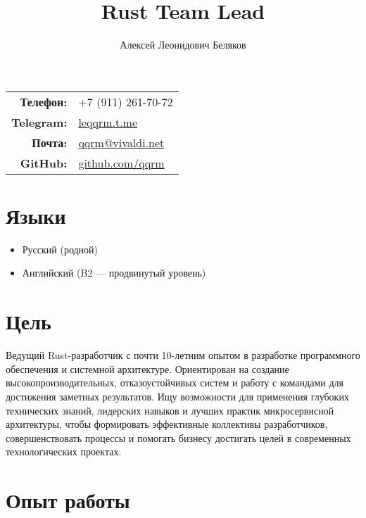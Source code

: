 \documentclass[a4paper,12pt]{article}
\title{\textbf{Rust Team Lead}}
\author{Алексей Леонидович Беляков}
\begin{document}
\maketitle

\begin{center}
    \begin{tabular}{rl}
        \textbf{Телефон:} & +7 (911) 261-70-72 \\
        \textbf{Telegram:} & \href{https://leqqrm.t.me}{leqqrm.t.me} \\
        \textbf{Почта:} & \href{mailto:qqrm@vivaldi.net}{qqrm@vivaldi.net} \\
        \textbf{GitHub:} & \href{https://github.com/qqrm}{github.com/qqrm} \\
    \end{tabular}
\end{center}

\vspace{5mm}

\section*{Языки}
\begin{itemize}[leftmargin=15pt]
    \item Русский (родной)
    \item Английский (B2 — продвинутый уровень)
\end{itemize}

\section*{Цель}
Ведущий Rust-разработчик с почти 10-летним опытом в разработке программного обеспечения и системной архитектуре. Ориентирован на создание высокопроизводительных, отказоустойчивых систем и работу с командами для достижения заметных результатов. Ищу возможности для применения глубоких технических знаний, лидерских навыков и лучших практик микросервисной архитектуры, чтобы формировать эффективные коллективы разработчиков, совершенствовать процессы и помогать бизнесу достигать целей в современных технологических проектах.

\section*{Опыт работы}
\end{document}
